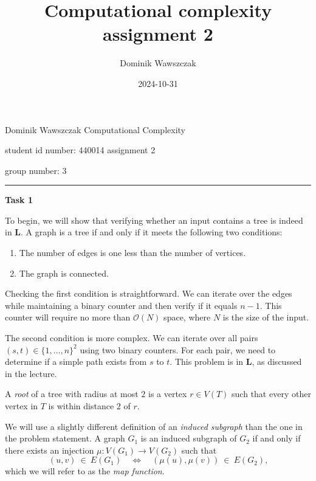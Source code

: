 \documentclass[12pt]{article}
\title{Computational complexity assignment 2}
\author{Dominik Wawszczak}
\date{2024-10-31}
\begin{document}
	\setlength{\parindent}{0 cm}
	
	Dominik Wawszczak \hfill Computational Complexity
	
	student id number: 440014 \hfill assignment 2
	
	group number: 3
	
	\bigskip
	\hrule
	\bigskip
	
	\textbf{Task 1}
	
	\medskip
	
	To begin, we will show that verifying whether an input contains a tree is
	indeed in \(\mathbf{L}\). A graph is a tree if and only if it meets the
	following two conditions:
	\begin{enumerate}
		\item The number of edges is one less than the number of vertices.
		\item The graph is connected.
	\end{enumerate}
	Checking the first condition is straightforward. We can iterate over the
	edges while maintaining a binary counter and then verify if it equals
	\(n - 1\). This counter will require no more than \(\mathcal{O}(N)\)
	space, where \(N\) is the size of the input.
	
	\medskip
	
	The second condition is more complex. We can iterate over all pairs \((s, t)
	\in \{1, \ldots, n\}^{2}\) using two binary counters. For each pair, we need
	to determine if a simple path exists from \(s\) to \(t\). This problem is in
	\(\mathbf{L}\), as discussed in the lecture.
	
	\medskip
	
	A \textit{root} of a tree with radius at most \(2\) is a vertex \(r \in
	V(T)\) such that every other vertex in \(T\) is within distance \(2\) of
	\(r\).
	
	\medskip
	
	We will use a slightly different definition of an \textit{induced subgraph}
	than the one in the problem statement. A graph \(G_{1}\) is an induced
	subgraph of \(G_{2}\) if and only if there exists an injection \(\mu :
	V(G_{1}) \to V(G_{2})\) such that
	\[ (u, v) \ \in \ E(G_{1}) \quad \iff \quad (\mu(u), \mu(v)) \ \in \
	E(G_{2}) \text{,} \]
	which we will refer to as the \textit{map function}.
	
	\medskip
	
\end{document}

